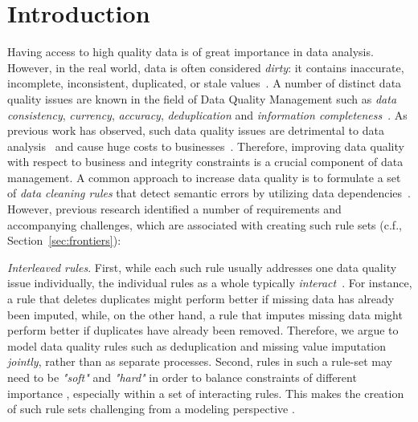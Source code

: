 \section{Introduction}
\label{sec:intro}

Having access to high quality data is of great importance in data analysis. However, in the real world, data is often considered \textit{dirty}: it contains inaccurate, incomplete, inconsistent, duplicated, or stale values~\cite{chu2004blissful}. A number of distinct data quality issues are known in the field of Data Quality Management such as \textit{data consistency}, \textit{currency}, \textit{accuracy}, \textit{deduplication} and \textit{information completeness}~\cite{fan2012foundations}. As previous work has observed, such data quality issues are detrimental to data analysis~\cite{national2013Frontiers,Fan:2008:CFD:1366102.1366103} and cause huge costs to businesses~\cite{waynew.eckerson2002}. Therefore, improving data quality with respect to business and integrity constraints is a crucial component of data management. 
A common approach to increase data quality is to formulate a set of \textit{data cleaning rules} that detect semantic errors by utilizing data dependencies~\cite{fan2012foundations, Arasu:2009:LDC:1546683.1547340, Dallachiesa:2013:NCD:2463676.2465327, llunaticVDLB2013b}. However, previous research identified a number of requirements and accompanying challenges, which are associated with creating such rule sets (c.f., Section~\ref{sec:frontiers}): 

\textit{Interleaved rules}. First, while each such rule usually addresses one data quality issue individually, the individual rules as a whole typically \textit{interact}~\cite{fan2012foundations, Fan:2014:IRM:2628135.2567657}. For instance, a rule that deletes duplicates might perform better if missing data has already been imputed, while, on the other hand, a rule that imputes missing data might perform better if duplicates have already been removed. Therefore, we argue to model data quality rules such as deduplication and missing value imputation \textit{jointly}, rather than as separate processes.
Second, rules in such a rule-set may need to be \textit{"soft"} and \textit{"hard"} in order to balance constraints of different importance \cite{Yakout:2013:DSU:2463676.2463706}, especially within a set of interacting rules. This makes the creation of such rule sets challenging from a modeling perspective . 

